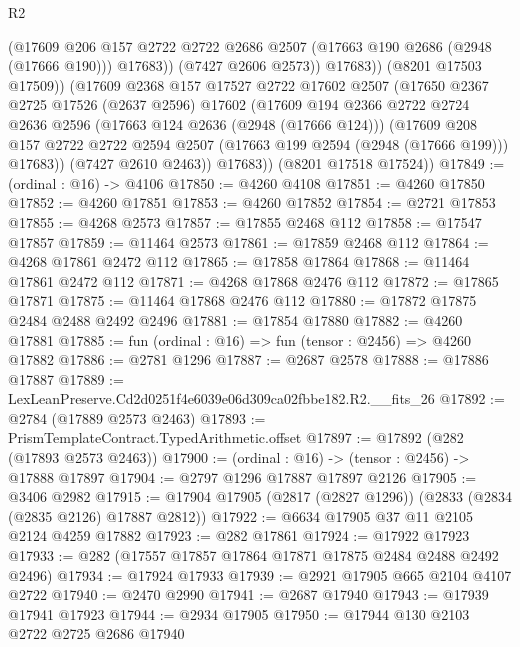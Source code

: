 \begin{lexlean}{R2}
\begin{coremodule}
                  (@17609
                    @206
                    @157
                    @2722
                    @2722
                    @2686
                    @2507
                    (@17663 @190 @2686 (@2948 (@17666 @190)))
                    @17683))
                (@7427 @2606 @2573))
              @17683))
          (@8201 @17503 @17509))
        (@17609
          @2368
          @157
          @17527
          @2722
          @17602
          @2507
          (@17650
            @2367
            @2725
            @17526
            (@2637 @2596)
            @17602
            (@17609
              @194
              @2366
              @2722
              @2724
              @2636
              @2596
              (@17663 @124 @2636 (@2948 (@17666 @124)))
              (@17609
                @208
                @157
                @2722
                @2722
                @2594
                @2507
                (@17663 @199 @2594 (@2948 (@17666 @199)))
                @17683))
            (@7427 @2610 @2463))
          @17683))
      (@8201 @17518 @17524))
@17849 := (ordinal : @16) -> @4106
@17850 := @4260 @4108
@17851 := @4260 @17850
@17852 := @4260 @17851
@17853 := @4260 @17852
@17854 := @2721 @17853
@17855 := @4268 @2573
@17857 := @17855 @2468 @112
@17858 := @17547 @17857
@17859 := @11464 @2573
@17861 := @17859 @2468 @112
@17864 := @4268 @17861 @2472 @112
@17865 := @17858 @17864
@17868 := @11464 @17861 @2472 @112
@17871 := @4268 @17868 @2476 @112
@17872 := @17865 @17871
@17875 := @11464 @17868 @2476 @112
@17880 := @17872 @17875 @2484 @2488 @2492 @2496
@17881 := @17854 @17880
@17882 := @4260 @17881
@17885 := fun (ordinal : @16) => fun (tensor : @2456) => @4260 @17882
@17886 := @2781 @1296
@17887 := @2687 @2578
@17888 := @17886 @17887
@17889 := LexLeanPreserve.Cd2d0251f4e6039e06d309ca02fbbe182.R2.__fits_26
@17892 := @2784 (@17889 @2573 @2463)
@17893 := PrismTemplateContract.TypedArithmetic.offset
@17897 := @17892 (@282 (@17893 @2573 @2463))
@17900 := (ordinal : @16) -> (tensor : @2456) -> @17888 @17897
@17904 := @2797 @1296 @17887 @17897 @2126
@17905 := @3406 @2982
@17915 := @17904 @17905 (@2817 (@2827 @1296)) (@2833 (@2834 (@2835 @2126) @17887 @2812))
@17922 := @6634 @17905 @37 @11 @2105 @2124 @4259 @17882
@17923 := @282 @17861
@17924 := @17922 @17923
@17933 := @282 (@17557 @17857 @17864 @17871 @17875 @2484 @2488 @2492 @2496)
@17934 := @17924 @17933
@17939 := @2921 @17905 @665 @2104 @4107 @2722
@17940 := @2470 @2990
@17941 := @2687 @17940
@17943 := @17939 @17941 @17923
@17944 := @2934 @17905
@17950 := @17944 @130 @2103 @2722 @2725 @2686 @17940

\end{coremodule}
\end{lexlean}
